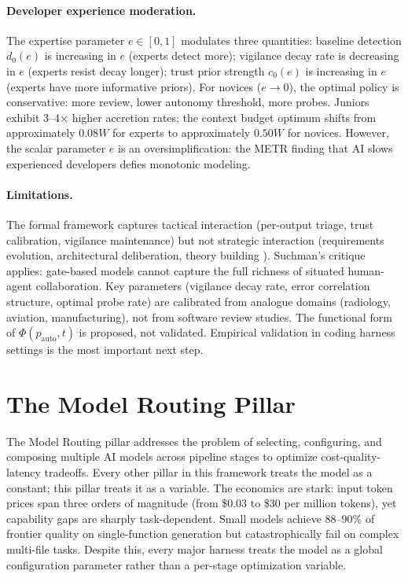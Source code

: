 \documentclass[11pt, a4paper]{googledeepmind}
\begin{document}
\paragraph{Developer experience moderation.} The expertise parameter $e \in [0,1]$ modulates three quantities: baseline detection $d_0(e)$ is increasing in $e$ (experts detect more); vigilance decay rate is decreasing in $e$ (experts resist decay longer); trust prior strength $c_0(e)$ is increasing in $e$ (experts have more informative priors). For novices ($e \to 0$), the optimal policy is conservative: more review, lower autonomy threshold, more probes. Juniors exhibit 3--4$\times$ higher accretion rates; the context budget optimum shifts from approximately $0.08W$ for experts to approximately $0.50W$ for novices. However, the scalar parameter $e$ is an oversimplification: the METR finding that AI slows experienced developers defies monotonic modeling.

\paragraph{Limitations.} The formal framework captures tactical interaction (per-output triage, trust calibration, vigilance maintenance) but not strategic interaction (requirements evolution, architectural deliberation, theory building \citep{naur1985programming}). Suchman's critique \citep{suchman1987plans} applies: gate-based models cannot capture the full richness of situated human-agent collaboration. Key parameters (vigilance decay rate, error correlation structure, optimal probe rate) are calibrated from analogue domains (radiology, aviation, manufacturing), not from software review studies. The functional form of $\Phi(p_{\text{auto}}, t)$ is proposed, not validated. Empirical validation in coding harness settings is the most important next step.


\section{The Model Routing Pillar}
\label{sec:routing}

The Model Routing pillar addresses the problem of selecting, configuring, and composing multiple AI models across pipeline stages to optimize cost-quality-latency tradeoffs. Every other pillar in this framework treats the model as a constant; this pillar treats it as a variable. The economics are stark: input token prices span three orders of magnitude (from \$0.03 to \$30 per million tokens), yet capability gaps are sharply task-dependent. Small models achieve 88--90\% of frontier quality on single-function generation but catastrophically fail on complex multi-file tasks. Despite this, every major harness treats the model as a global configuration parameter rather than a per-stage optimization variable.
\end{document}
